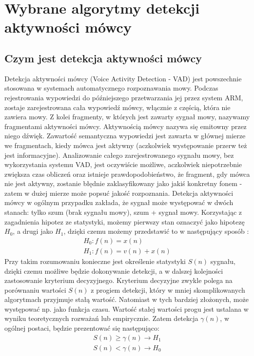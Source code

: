 \documentclass[eng,printmode]{mgr}
\begin{document}
 
\chapter{Wybrane algorytmy detekcji aktywności mówcy}
 \section{Czym jest detekcja aktywności mówcy}
 
 Detekcja aktywności mówcy (Voice Activity Detection - VAD) jest powszechnie stosowana w systemach automatycznego rozpoznawania mowy. Podczas rejestrowania wypowiedzi do późniejszego przetwarzania jej przez system ARM, zostaje zarejestrowana cała wypowiedź mówcy, włącznie z częścią, która nie zawiera mowy. Z kolei fragmenty, w których jest zawarty sygnał mowy, nazywamy fragmentami aktywności mówcy. Aktywnością mówcy nazywa się emitowny przez niego dźwięk. Zawartość semantyczna wypowiedzi jest zawarta w głównej mierze we fragmentach, kiedy mówca jest aktywny (aczkolwiek występowanie przerw też jest informacyjne). Analizowanie całego  zarejestrowanego sygnału mowy, bez wykorzystania systemu VAD, jest oczywiście możliwe, aczkolwiek niepotrzebnie zwiększa czas obliczeń oraz istnieje prawdopodobieństwo, że fragment, gdy mówca nie jest aktywny, zostanie błędnie zaklasyfikowany jako jakiś konkretny fonem - zatem w dużej mierze może popsuć jakość rozpoznania. Detekcja aktywności mówcy w ogólnym przypadku zakłada, że sygnał może występować w dwóch stanach: tylko szum (brak sygnału mowy), szum + sygnał mowy. Korzystając z zagadnienia hipotez ze statystyki, możemy pierwszy stan oznaczyć jako hipotezę $H_{0}$, a drugi jako $H_{1}$, dzięki czemu możemy przedstawić to w następujący sposób \cite{prof}:
 \begin{equation}
  \begin{array}{c}
	  H_{0}: f(n)=x(n)\\
	  H_{1}: f(n)=v(n)+x(n)
  \end{array} 	 
 \end{equation}
  Przy takim rozumowaniu konieczne jest określenie statystyki $S(n)$ sygnału, dzięki czemu możliwe będzie dokonywanie detekcji, a w dalszej kolejności zastosowanie kryterium decyzyjnego. Kryterium decyzyjne zwykle polega na porównaniu wartości $S(n)$ z progiem detekcji, który w mniej skomplikowanych algorytmach przyjmuje stałą wartość. Natomiast w tych bardziej złożonych, może występować np. jako funkcja czasu. Wartość stałej wartości progu jest ustalana w wyniku teoretycznych rozważań lub empirycznie. Zatem detekcja $\gamma(n)$, w ogólnej postaci, będzie prezentować się następująco:
   \begin{equation}
   \begin{array}{c}
	   S(n)\geq\gamma(n)\to H_{1}\\
	   S(n)<\gamma(n)\to H_{0}
   \end{array} 	 
   \end{equation}
 
\end{document}
